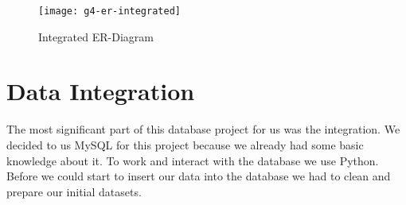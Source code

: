 \begin{figure}[H]
    \centering
    \texttt{[image: g4-er-integrated]}
    \caption{Integrated ER-Diagram}
    \label{fig:integratedER}
\end{figure}

\section{Data Integration}

The most significant part of this database project for us was the integration. We decided to us MySQL for this project because we already had some basic knowledge about it. To work and interact with the database we use Python. Before we could start to insert our data into the database we had to clean and prepare our initial datasets.

